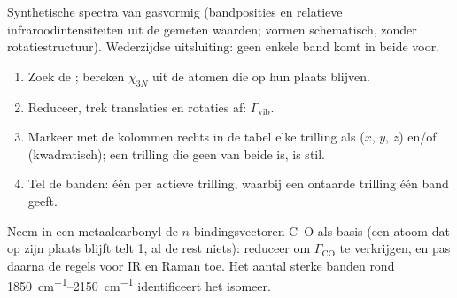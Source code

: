 \begin{omfigure}

{\small Synthetische spectra van gasvormig  (bandposities en
relatieve infraroodintensiteiten uit de gemeten waarden; vormen
schematisch, zonder rotatiestructuur). Wederzijdse uitsluiting: geen enkele
band komt in beide voor.}
\end{omfigure}

\begin{method}\label{met:b3:group-theory-applied:vibrations}
\begin{enumerate}
  \item Zoek de ; bereken $\chi_{3N}$ uit de atomen die op hun
        plaats blijven.
  \item Reduceer, trek translaties en rotaties af: $\Gamma_{\mathrm{vib}}$.
  \item Markeer met de kolommen rechts in de tabel elke trilling als
         ($x$, $y$, $z$) en/of  (kwadratisch); een
        trilling die geen van beide is, is stil.
  \item Tel de banden: één per actieve trilling, waarbij een ontaarde
        trilling één band geeft.
\end{enumerate}
\end{method}

\begin{method}\label{met:b3:group-theory-applied:co-count}
Neem in een metaalcarbonyl de $n$ bindingsvectoren C--O als basis (een
atoom dat op zijn plaats blijft telt 1, al de rest niets): reduceer om
$\Gamma_{\mathrm{CO}}$ te verkrijgen, en pas daarna
de regels voor IR en Raman toe. Het aantal sterke banden rond
\qtyrange{1850}{2150}{cm^{-1}} identificeert het isomeer.
\end{method}


